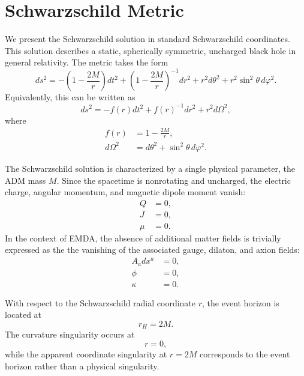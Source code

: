 \section{Schwarzschild Metric}


\label{sec:appx:SchwarzschildBH}

We present the Schwarzschild solution in standard Schwarzschild coordinates. This solution describes a static, spherically symmetric, uncharged black hole in general relativity. The metric takes the form
\begin{equation}
ds^2 =
-\left(1-\frac{2M}{r}\right)dt^2
+\left(1-\frac{2M}{r}\right)^{-1}dr^2
+r^2 d\theta^2
+r^2\sin^2\theta\, d\varphi^2 .
\end{equation}
Equivalently, this can be written as
\begin{equation}
ds^2 =
-f(r)dt^2
+f(r)^{-1}dr^2
+r^2 d\Omega^2 ,
\end{equation}
where
\begin{align}
f(r) &= 1-\frac{2M}{r}, \\
d\Omega^2 &= d\theta^2+\sin^2\theta\,d\varphi^2 .
\end{align}

The Schwarzschild solution is characterized by a single physical parameter, the ADM mass \(M\). Since the spacetime is nonrotating and uncharged, the electric charge, angular momentum, and magnetic dipole moment vanish:
\begin{align}
Q &= 0, \\
J &= 0, \\
\mu &= 0 .
\end{align}
In the context of EMDA, the absence of additional matter fields is trivially expressed as the the vanishing of the associated gauge, dilaton, and axion fields: 
\begin{align}
A_a dx^a &= 0, \\
\phi &= 0, \\
\kappa &= 0 .
\end{align}

With respect to the Schwarzschild radial coordinate \(r\), the event horizon is located at
\begin{equation}
r_H = 2M .
\end{equation}
The curvature singularity occurs at
\begin{equation}
r=0,
\end{equation}
while the apparent coordinate singularity at \(r=2M\) corresponds to the event horizon rather than a physical singularity.

